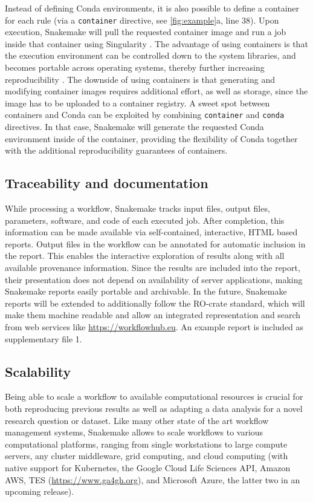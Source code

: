 \documentclass[parskip=half]{scrartcl}
\let\plainurl\url
\renewcommand{\url}[1]{\protect\plainurl{#1}}
\begin{document}
Instead of defining Conda environments, it is also possible to define a container for each rule (via a \lstinline!container! directive, see \autoref{fig:example}a, line 38).
Upon execution, Snakemake will pull the requested container image and run a job inside that container using Singularity \parencite{kurtzer_singularity_2017}.
The advantage of using containers is that the execution environment can be controlled down to the system libraries, and becomes portable across operating systems, thereby further increasing reproducibility \parencite{gruning_practical_2018}.
The downside of using containers is that generating and modifying container images requires additional effort, as well as storage, since the image has to be uploaded to a container registry.
A sweet spot between containers and Conda can be exploited by combining \lstinline!container! and \lstinline!conda! directives.
In that case, Snakemake will generate the requested Conda environment inside of the container, providing the flexibility of Conda together with the additional reproducibility guarantees of containers.

\subsection{Traceability and documentation}

While processing a workflow, Snakemake tracks input files, output files, parameters, software, and code of each executed job.
After completion, this information can be made available via self-contained, interactive, HTML based reports.
Output files in the workflow can be annotated for automatic inclusion in the report.
This enables the interactive exploration of results along with all available provenance information.
Since the results are included into the report, their presentation does not depend on availability of server applications, making Snakemake reports easily portable and archivable.
In the future, Snakemake reports will be extended to additionally follow the RO-crate standard, which will make them machine readable and allow an integrated representation and search from web services like \url{https://workflowhub.eu}.
An example report is included as supplementary file 1.

\subsection{Scalability}\label{sec:scalability}

Being able to scale a workflow to available computational resources is crucial for both reproducing previous results as well as adapting a data analysis for a novel research question or dataset.
Like many other state of the art workflow management systems, Snakemake allows to scale workflows to various computational platforms, ranging from single workstations to large compute servers, any cluster middleware, grid computing, and cloud computing (with native support for Kubernetes, the Google Cloud Life Sciences API, Amazon AWS, TES (\url{https://www.ga4gh.org}), and Microsoft Azure, the latter two in an upcoming release).
\end{document}
